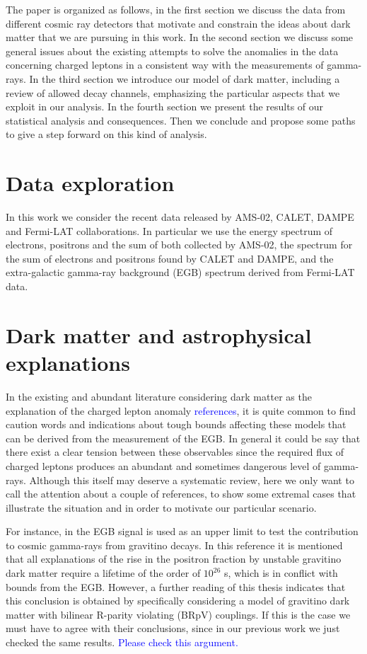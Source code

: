 \documentclass[a4paper,11pt]{article}
\newcommand*{\blue}{\textcolor{blue}}
\begin{document}
The paper is organized as follows, in the first section we discuss the data from different cosmic ray detectors that motivate and constrain the ideas about dark matter that we are pursuing in this work. In the second section we discuss some general issues about the existing attempts
to solve the anomalies in the data concerning charged leptons in a consistent way with the measurements of gamma-rays. In the third section we introduce our model of dark matter, including a review of allowed decay channels, emphasizing the particular aspects that we exploit in our analysis. In the fourth section we present the results of our statistical analysis and consequences. Then we conclude and propose some paths to give a step forward on this kind of analysis.


\section{Data exploration}

In this work we consider the recent data released by AMS-02, CALET, DAMPE and Fermi-LAT collaborations. In particular we use the energy spectrum of electrons, positrons and the sum of both collected by AMS-02, the spectrum for the sum of electrons and positrons found by CALET and DAMPE, and the extra-galactic gamma-ray background (EGB) spectrum derived from Fermi-LAT data.

\section{Dark matter and astrophysical explanations}

In the existing and abundant literature considering dark matter as the explanation of the charged lepton anomaly \blue{references}, it is quite common to find caution words and indications about tough bounds affecting these models that can be derived from the measurement of the EGB. In general it could be say that there exist a clear tension between these observables since the required flux of charged leptons produces an abundant and sometimes dangerous level of gamma-rays. Although this itself may deserve a systematic review, here we only want to call the attention about a couple of references, to show some extremal cases that illustrate the situation and in order to motivate our particular scenario.

For instance, in \cite{Grefe:2011dp} the EGB signal is used as an upper limit to test the contribution to cosmic gamma-rays from gravitino decays. In this reference it is mentioned that all explanations of the rise in the positron fraction by unstable gravitino dark matter require a lifetime of the order of $10^{26}$ s, which is in conflict with bounds from the EGB. However, a further reading of this thesis indicates that this conclusion is obtained by specifically considering a model of gravitino dark matter with bilinear R-parity  violating (BRpV) couplings. If this is the case we must have to agree with their conclusions, since in our previous work we just checked the same results. \blue{Please check this argument.} 
\end{document}
